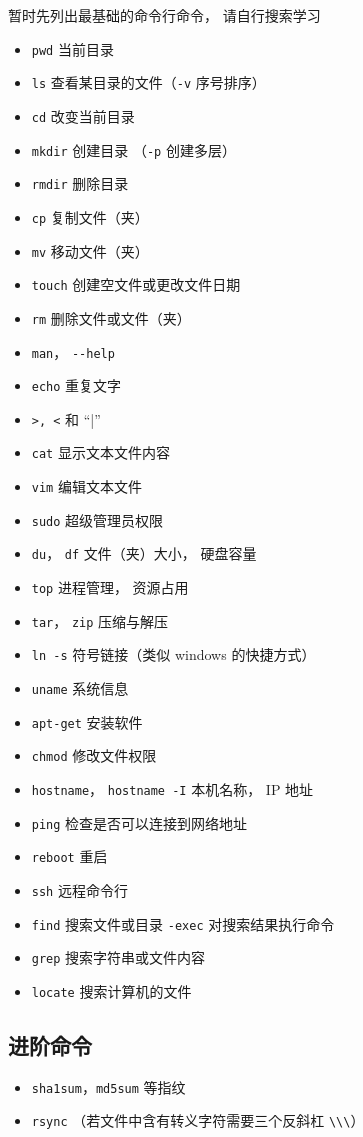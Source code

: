 暂时先列出最基础的命令行命令， 请自行搜索学习
\begin{itemize}
\item \verb|pwd| 当前目录
\item \verb|ls| 查看某目录的文件（\verb|-v| 序号排序）
\item \verb|cd| 改变当前目录
\item \verb|mkdir| 创建目录 （\verb|-p| 创建多层）
\item \verb|rmdir| 删除目录
\item \verb|cp| 复制文件（夹）
\item \verb|mv| 移动文件（夹）
\item \verb|touch| 创建空文件或更改文件日期
\item \verb|rm| 删除文件或文件（夹）
\item \verb|man|， \verb|--help|
\item \verb|echo| 重复文字
\item \verb|>, <| 和 “|”
\item \verb|cat| 显示文本文件内容
\item \verb|vim| 编辑文本文件
\item \verb|sudo| 超级管理员权限
\item \verb|du|， \verb|df| 文件（夹）大小， 硬盘容量
\item \verb|top| 进程管理， 资源占用
\item \verb|tar|， \verb|zip| 压缩与解压
\item \verb|ln -s| 符号链接（类似 windows 的快捷方式）
\item \verb|uname| 系统信息
\item \verb|apt-get| 安装软件
\item \verb|chmod| 修改文件权限
\item \verb|hostname|， \verb|hostname -I| 本机名称， IP 地址
\item \verb|ping| 检查是否可以连接到网络地址
\item \verb|reboot| 重启
\item \verb|ssh| 远程命令行
\item \verb|find| 搜索文件或目录 \verb|-exec| 对搜索结果执行命令
\item \verb|grep| 搜索字符串或文件内容
\item \verb|locate| 搜索计算机的文件
\end{itemize}

\subsection{进阶命令}
\begin{itemize}
\item \verb|sha1sum|，\verb|md5sum| 等指纹
\item \verb|rsync| （若文件中含有转义字符需要三个反斜杠 \verb|\\\|）
\end{itemize}
